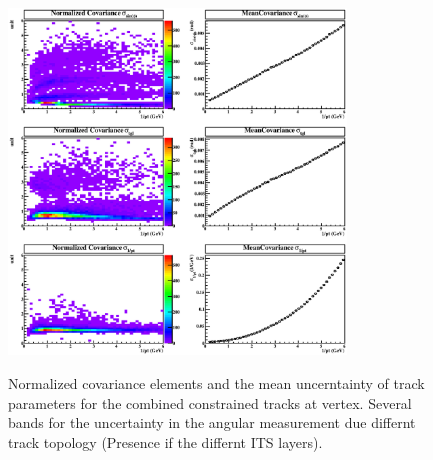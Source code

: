 \documentclass[12pt]{article}
\begin{document}
\begin{figure}[htbp]
\begin{center}
\includegraphics[width=0.8\textwidth]{figures/covarScaledConst.eps}
\label{fig_CovarTPC}
\end{center}
\caption{Normalized covariance elements and the mean uncerntainty of track parameters for the combined constrained  tracks at vertex. Several bands for the uncertainty in the angular measurement due differnt track topology (Presence if the differnt ITS layers).}
\end{figure}
\end{document}
